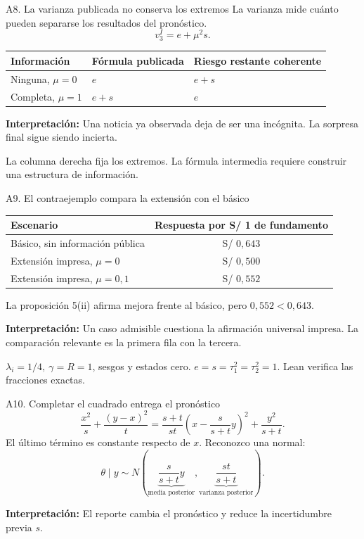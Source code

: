 \documentclass[aspectratio=169,11pt]{beamer}
\newcommand{\idea}[1]{\par\medskip\textbf{Interpretación:} #1}
\begin{document}
\begin{frame}{A8. La varianza publicada no conserva los extremos}
La varianza mide cuánto pueden separarse los resultados del pronóstico.
\[
 v_3^I=e+\mu^2s.
\]
\begin{center}
\begin{tabular}{lll}
\toprule
Información & Fórmula publicada & Riesgo restante coherente\\
\midrule
Ninguna, \(\mu=0\) & \(e\) & \(e+s\)\\
Completa, \(\mu=1\) & \(e+s\) & \(e\)\\
\bottomrule
\end{tabular}
\end{center}
\idea{Una noticia ya observada deja de ser una incógnita.
La sorpresa final sigue siendo incierta.}
\small\medskip\par
La columna derecha fija los extremos. La fórmula intermedia requiere
construir una estructura de información.
\end{frame}

\begin{frame}{A9. El contraejemplo compara la extensión con el básico}
\begin{center}
\begin{tabular}{lc}
\toprule
Escenario & Respuesta por S/ 1 de fundamento\\
\midrule
Básico, sin información pública & S/ \(0{,}643\)\\
Extensión impresa, \(\mu=0\) & S/ \(0{,}500\)\\
Extensión impresa, \(\mu=0{,}1\) & S/ \(0{,}552\)\\
\bottomrule
\end{tabular}
\end{center}
La proposición 5(ii) afirma mejora frente al básico, pero \(0{,}552<0{,}643\).
\idea{Un caso admisible cuestiona la afirmación universal impresa.
La comparación relevante es la primera fila con la tercera.}
\small\medskip\par
\(\lambda_i=1/4,\ \gamma=R=1\), sesgos y estados cero.
\(e=s=\tau_1^2=\tau_2^2=1\). Lean verifica las fracciones exactas.
\end{frame}

\begin{frame}{A10. Completar el cuadrado entrega el pronóstico}
\[
 \frac{x^2}{s}+\frac{(y-x)^2}{t}
 =\frac{s+t}{st}\left(x-\frac{s}{s+t}y\right)^2+\frac{y^2}{s+t}.
\]
El último término es constante respecto de \(x\). Reconozco una normal:
\[
 \theta\mid y\sim
 N\left(\underbrace{\frac{s}{s+t}y}_{\text{media posterior}},
 \underbrace{\frac{st}{s+t}}_{\text{varianza posterior}}\right).
\]
\idea{El reporte cambia el pronóstico y reduce la incertidumbre previa \(s\).}
\end{frame}
\end{document}
